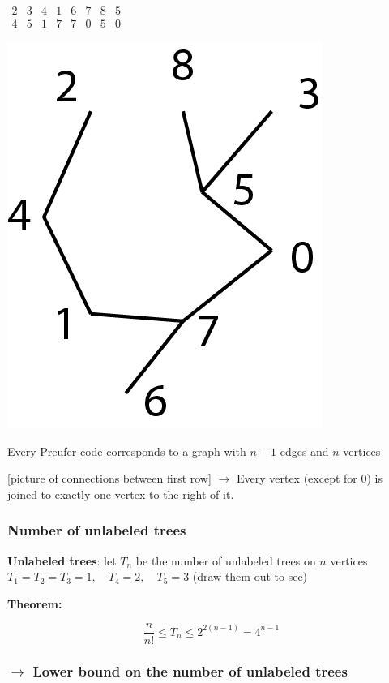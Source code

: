 \documentclass[9pt, letterpaper, oneside]{article}
\begin{document}
$\begin{matrix}
2 &3& 4& 1& 6& 7& 8 &5\\
4 &5& 1& 7& 7& 0& 5& 0
\end{matrix}
$

\includegraphics{fig5.png} 

Every Preufer code corresponds to a graph with $n-1$ edges and $n$ vertices

[picture of connections between first row] $\to$ Every vertex (except for 0) is joined to exactly one vertex to the right of it.

\subsubsection{Number of unlabeled trees}

\textbf{Unlabeled trees}: let $T_n$ be the number of unlabeled trees on $n$ vertices $T_1 = T_2 = T_3 = 1, \quad T_4 = 2, \quad T_5 = 3$ (draw them out to see)

\textbf{Theorem:}

$$\displaystyle \frac{n}{n!} \leq T_n \leq 2^{2(n-1)} = 4^{n-1}$$

\subsubsection*{$\to$ Lower bound on the number of unlabeled trees}
\end{document}
